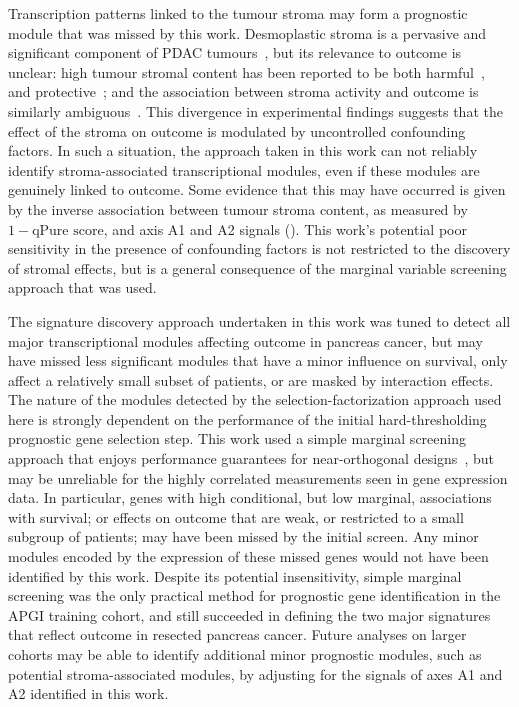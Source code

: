 \documentclass[dissertation.tex]{subfiles}
\begin{document}
Transcription patterns linked to the tumour stroma may form a prognostic module that was missed by this work.  Desmoplastic stroma is a pervasive and significant component of \gls{PDAC} tumours~\cite{Hidalgo2010}, but its relevance to outcome is unclear: high tumour stromal content has been reported to be both harmful~\cite{Luo2012, Provenzano2012}, and protective~\cite{Rhim2014, Sinn2014}; and the association between stroma activity and outcome is similarly ambiguous~\cite{Bever2014, Sinn2014}.  This divergence in experimental findings suggests that the effect of the stroma on outcome is modulated by uncontrolled confounding factors.  In such a situation, the approach taken in this work can not reliably identify stroma-associated transcriptional modules, even if these modules are genuinely linked to outcome.  Some evidence that this may have occurred is given by the inverse association between tumour stroma content, as measured by $1 - \mbox{qPure score}$, and axis A1 and A2 signals ().  This work's potential poor sensitivity in the presence of confounding factors is not restricted to the discovery of stromal effects, but is a general consequence of the marginal variable screening approach that was used.

The signature discovery approach undertaken in this work was tuned to detect all major transcriptional modules affecting outcome in pancreas cancer, but may have missed less significant modules that have a minor influence on survival, only affect a relatively small subset of patients, or are masked by interaction effects.  The nature of the modules detected by the selection-factorization approach used here is strongly dependent on the performance of the initial hard-thresholding prognostic gene selection step.  This work used a simple marginal screening approach that enjoys performance guarantees for near-orthogonal designs~\cite{Fan2008}, but may be unreliable for the highly correlated measurements seen in gene expression data.  In particular, genes with high conditional, but low marginal, associations with survival; or effects on outcome that are weak, or restricted to a small subgroup of patients; may have been missed by the initial screen.  Any minor modules encoded by the expression of these missed genes would not have been identified by this work.  Despite its potential insensitivity, simple marginal screening was the only practical method for prognostic gene identification in the \gls{APGI} training cohort, and still succeeded in defining the two major signatures that reflect outcome in resected pancreas cancer.  Future analyses on larger cohorts may be able to identify additional minor prognostic modules, such as potential stroma-associated modules, by adjusting for the signals of axes A1 and A2 identified in this work.
\end{document}
